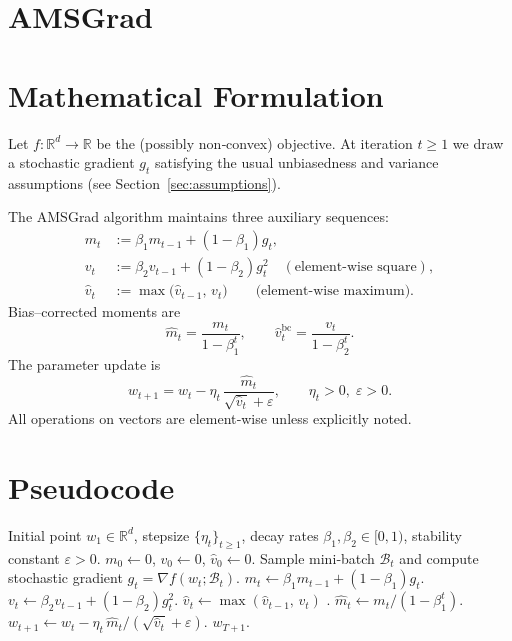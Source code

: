 \documentclass{article}
\newcommand{\RR}{\mathbb{R}}
\begin{document}
\section*{AMSGrad}

\section*{Mathematical Formulation}
Let $f:\RR^{d}\rightarrow\RR$ be the (possibly non‑convex) objective.  
At iteration $t\ge 1$ we draw a stochastic gradient $g_{t}$ satisfying the usual unbiasedness and variance assumptions (see Section~\ref{sec:assumptions}).  

The AMSGrad algorithm maintains three auxiliary sequences:
\[
\begin{aligned}
m_{t} &:= \beta_{1} m_{t-1} + (1-\beta_{1}) g_{t},\\[2mm]
v_{t} &:= \beta_{2} v_{t-1} + (1-\beta_{2}) g_{t}^{2}\quad (\text{element‑wise square}),\\[2mm]
\hat{v}_{t} &:= \max\!\bigl(\hat{v}_{t-1},\,v_{t}\bigr) \qquad\text{(element‑wise maximum).}
\end{aligned}
\]
Bias–corrected moments are
\[
\hat{m}_{t}= \frac{m_{t}}{1-\beta_{1}^{t}},\qquad 
\hat{v}_{t}^{\text{bc}} = \frac{v_{t}}{1-\beta_{2}^{t}} .
\]
The parameter update is
\[
w_{t+1}= w_{t} - \eta_{t}\,\frac{\hat{m}_{t}}{\sqrt{\hat{v}_{t}}+\varepsilon},
\qquad \eta_{t}>0,\; \varepsilon>0 .
\]
All operations on vectors are element‑wise unless explicitly noted.

\section*{Pseudocode}
\begin{algorithm}[H]
\caption{AMSGrad}
\label{alg:amsgrad}
\begin{algorithmic}[1]
\Require Initial point $w_{1}\in\RR^{d}$, stepsize $\{\eta_{t}\}_{t\ge1}$,
        decay rates $\beta_{1},\beta_{2}\in[0,1)$, stability constant $\varepsilon>0$.
\State $m_{0}\gets 0$, $v_{0}\gets 0$, $\hat v_{0}\gets 0$.
    \State Sample mini‑batch $\mathcal{B}_{t}$ and compute stochastic gradient 
          $g_{t}= \nabla f(w_{t};\mathcal{B}_{t})$.
    \State $m_{t}\gets \beta_{1} m_{t-1} + (1-\beta_{1}) g_{t}$.
    \State $v_{t}\gets \beta_{2} v_{t-1} + (1-\beta_{2}) g_{t}^{2}$.
    \State $\hat v_{t}\gets \max(\hat v_{t-1},\,v_{t})$ .
    \State $\hat m_{t}\gets m_{t}/(1-\beta_{1}^{t})$.
    \State $w_{t+1}\gets w_{t} - \eta_{t}\,\hat m_{t}\big/(\sqrt{\hat v_{t}}+\varepsilon)$.
\EndFor
\State \Return $w_{T+1}$.
\end{algorithmic}
\end{algorithm}
\end{document}

